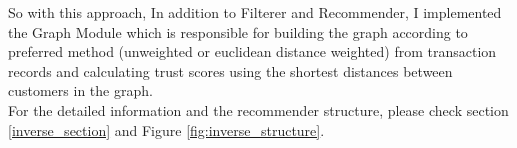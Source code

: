 So with this approach, In addition to Filterer and Recommender, I implemented the Graph Module which is responsible for building the graph according to preferred method (unweighted or euclidean distance weighted) from transaction records and calculating trust scores using the shortest distances between customers in the graph. \\

For the detailed information and the recommender structure, please check section \ref{inverse_section} and Figure \ref{fig:inverse_structure}.